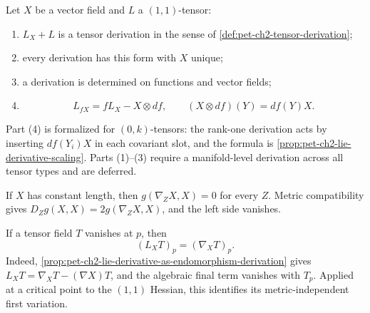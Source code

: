 \begin{remark}
  \label{rem:pet-ch2-ex-16}
  \leanok
  Let $X$ be a vector field and $L$ a
  $(1,1)$-tensor:
  \begin{enumerate}
    \item $L_X+L$ is a tensor derivation in the sense of
      \cref{def:pet-ch2-tensor-derivation};
    \item every derivation has this form with $X$ unique;
    \item a derivation is determined on functions and vector fields;
    \item
      \[
        L_{fX}=fL_X-X\otimes df,\qquad
        (X\otimes df)(Y)=df(Y)X.
      \]
  \end{enumerate}
  Part (4) is formalized for $(0,k)$-tensors: the rank-one derivation acts by
  inserting $df(Y_i)X$ in each covariant slot, and the formula is
  \cref{prop:pet-ch2-lie-derivative-scaling}. Parts (1)--(3) require a
  manifold-level derivation across all tensor types and are deferred.
\end{remark}

\begin{remark}
  \label{rem:pet-ch2-ex-17}
  \leanok
  If $X$ has constant length, then
  $g(\nabla_ZX,X)=0$ for every $Z$.
  \sketch
  Metric compatibility gives
  $D_Zg(X,X)=2g(\nabla_ZX,X)$, and the left side vanishes.
\end{remark}

\begin{remark}
  \label{rem:pet-ch2-ex-18}
  \leanok
  If a tensor field $T$ vanishes at $p$, then
  \[
    (L_XT)_p=(\nabla_XT)_p.
  \]
  \sketch
  Indeed, \cref{prop:pet-ch2-lie-derivative-as-endomorphism-derivation} gives
  $L_XT=\nabla_XT-(\nabla X)T$, and the algebraic final term vanishes with
  $T_p$. Applied at a critical point to the $(1,1)$ Hessian, this identifies
  its metric-independent first variation.
\end{remark}

